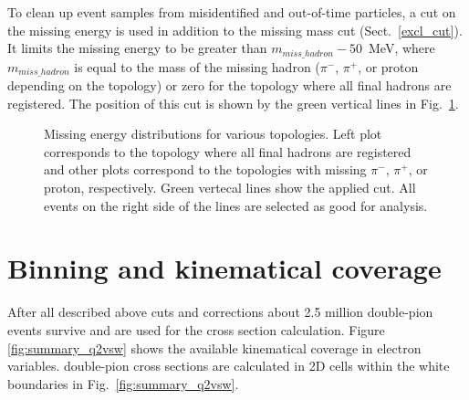 To clean up event samples from misidentified and out-of-time particles, a cut on the missing energy is used in addition to the missing mass cut (Sect.~\ref{excl_cut}). It limits the missing energy to be greater than $m_{miss\_hadron} - 50$~MeV, where $m_{miss\_hadron}$ is equal to the mass of the missing hadron ($\pi^-$, $\pi^+$, or proton depending on the topology) or zero for the topology where all final hadrons are registered. The position of this cut is shown by the green vertical lines in Fig.~\ref{fig:miss_en}.
\begin{figure}[htp]
\begin{center}
\caption{\small   Missing energy distributions for various topologies. Left plot corresponds to the topology where all final hadrons are registered and other plots correspond to the topologies with missing $\pi^-$, $\pi^+$, or proton, respectively. Green vertecal lines show the applied cut. All events on the right side of the lines are selected as good for analysis.\label{fig:miss_en}}
\end{center}
\end{figure}

\section{Binning and kinematical coverage}
\label{cuts_sum}

After all described above cuts and corrections about 2.5 million double-pion events survive and are used for the cross section calculation. Figure \ref{fig:summary_q2vsw} shows the available kinematical coverage in electron variables. double-pion cross sections are calculated in 2D cells within the white boundaries in Fig.~\ref{fig:summary_q2vsw}.

